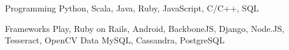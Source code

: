 

\begin{cvskills}

  \cvskill
    {Programming} %
    {Python, Scala, Java, Ruby, JavaScript, C/C++, SQL} %


  \cvskill
  {Frameworks} %
    {Play, Ruby on Rails, Android, BackboneJS, Django, Node.JS, Tesseract, OpenCV } %
  \cvskill
  {Data} %
    {MySQL, Cassandra, PostgreSQL} %
\end{cvskills}
